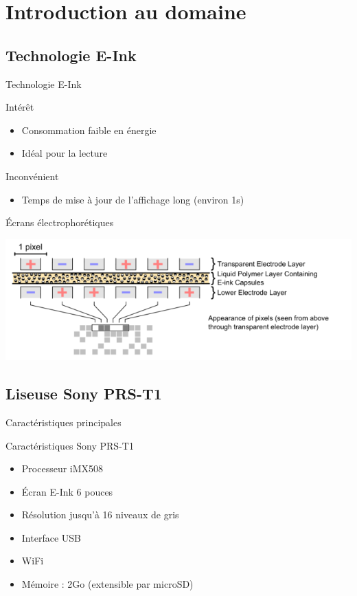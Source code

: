 \section[Intruduction]{Introduction au domaine}


\subsection[E-Ink]{Technologie E-Ink}
\begin{frame}{Technologie E-Ink}
	\begin{block}{Intérêt}
		\begin{itemize}
			\item Consommation faible en énergie
			\item Idéal pour la lecture
		\end{itemize}
	\end{block}
		\begin{block}{Inconvénient}
		\begin{itemize}
			\item Temps de mise à jour de l'affichage long (environ 1s)
		\end{itemize}
	\end{block}
\end{frame}

\begin{frame}{Écrans électrophorétiques}
\begin{center}
	\includegraphics[scale=0.65]{Electrophoretic.png}
\end{center}	
\end{frame}


\subsection[Sony PRS-T1]{Liseuse Sony PRS-T1}

\begin{frame}{Caractéristiques principales} %
	\begin{block}{Caractéristiques Sony PRS-T1}
		\begin{itemize}
			\item Processeur iMX508
			\item Écran E-Ink 6 pouces
			\item Résolution jusqu'à 16 niveaux de gris
			\item Interface USB
			\item WiFi
			\item Mémoire : 2Go (extensible par microSD)
		\end{itemize}
	\end{block}
\end{frame}

